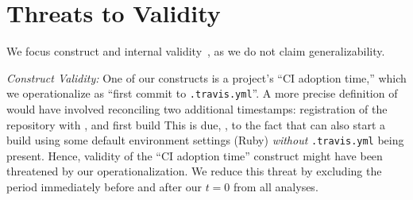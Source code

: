 
\section{Threats to Validity}
\label{sec:threats}
We focus construct and internal validity~\cite{perry2000empirical}, as we 
do not claim generalizability.

\smallskip \emph{Construct Validity:} %
One of our constructs is a project's ``CI adoption time,'' which 
we operationalize as ``first commit to \texttt{.travis.yml}''. %
A more precise definition of would have involved 
reconciling two additional timestamps: registration of the repository with \Tvis, and 
first build
This is due, \eg, to the fact that \Tvis can also start a build using some default 
environment settings (Ruby) \emph{without} \texttt{.travis.yml} being present.
Hence, validity of the ``CI adoption time'' construct might have been threatened 
by our operationalization.
We reduce this threat by excluding the period immediately before and after
our $t=0$ from all analyses.

